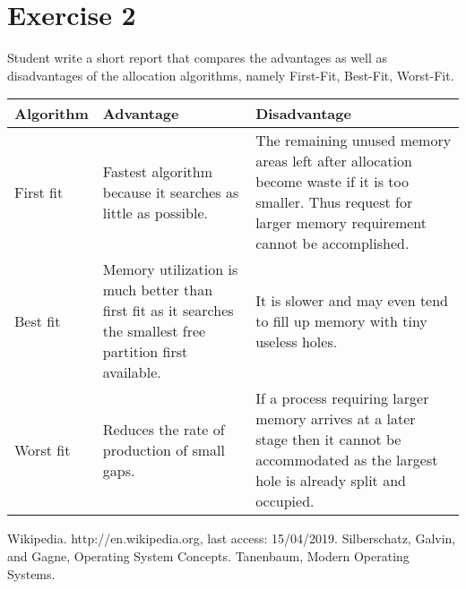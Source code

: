 \documentclass[11pt]{article}
\begin{document}
\section*{Exercise 2}
Student write a short report that compares the advantages as well as disadvantages
of the allocation algorithms, namely First-Fit, Best-Fit, Worst-Fit.

\begin{table}[!htp]
    \centering
    \def\arraystretch{1.5}

    \begin{tabular}{|m{2cm}|m{6.5cm}|m{7.5cm}|}
    \hline
    Algorithm & Advantage                                                                                                    & Disadvantage                                                                                                                                                  \\ \hline
    First fit & Fastest algorithm because it searches as little as possible.                                                 & The remaining unused memory areas left after allocation become waste if it is too smaller. Thus request for larger memory requirement cannot be accomplished. \\ \hline
    Best fit  & Memory utilization is much better than first fit as it searches the smallest free partition first available. & It is slower and may even tend to fill up memory with tiny useless holes.                                                                                     \\ \hline
    Worst fit & Reduces the rate of production of small gaps.                                                                & If a process requiring larger memory arrives at a later stage then it cannot be accommodated as the largest hole is already split and occupied.               \\ \hline
    \end{tabular}
\end{table}

\newpage
\begin{thebibliography}{80}
     Wikipedia. http://en.wikipedia.org, last access: 15/04/2019.
      Silberschatz, Galvin, and Gagne, Operating System Concepts.
     Tanenbaum, Modern Operating Systems.
\end{thebibliography}
\end{document}
